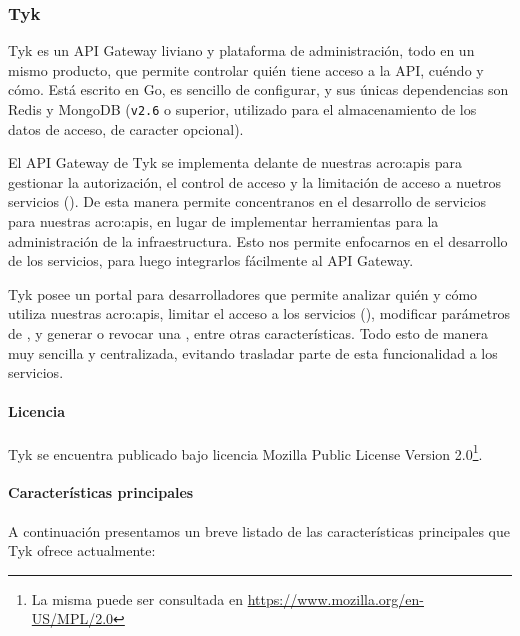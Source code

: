 \subsubsection{Tyk}
\label{soa:tecnologias:tyk}

Tyk es un API Gateway liviano y plataforma de administración, todo en un mismo producto, que permite controlar quién tiene acceso a la API, cuéndo y cómo.  Está escrito en Go, es sencillo de configurar, y sus únicas dependencias son Redis y MongoDB (\texttt{v2.6} o superior, utilizado para el almacenamiento de los datos de acceso, de caracter opcional).

El API Gateway de Tyk se implementa delante de nuestras \glspl{acro:api} para gestionar la autorización, el control de acceso y la limitación de acceso a nuetros servicios ().  De esta manera permite concentranos en el desarrollo de servicios para nuestras \glspl{acro:api}, en lugar de implementar herramientas para la administración de la infraestructura.  Esto nos permite enfocarnos en el desarrollo de los servicios, para luego integrarlos fácilmente al API Gateway.

Tyk posee un portal para desarrolladores que permite analizar quién y cómo utiliza nuestras \glspl{acro:api}, limitar el acceso a los servicios (), modificar parámetros de , y generar o revocar una , entre otras características.  Todo esto de manera muy sencilla y centralizada, evitando trasladar parte de esta funcionalidad a los servicios.

\paragraph{Licencia}

Tyk se encuentra publicado bajo licencia Mozilla Public License Version 2.0\footnote{La misma puede ser consultada en \url{https://www.mozilla.org/en-US/MPL/2.0}}.

\paragraph{Características principales}

A continuación presentamos un breve listado de las características principales que Tyk ofrece actualmente:

